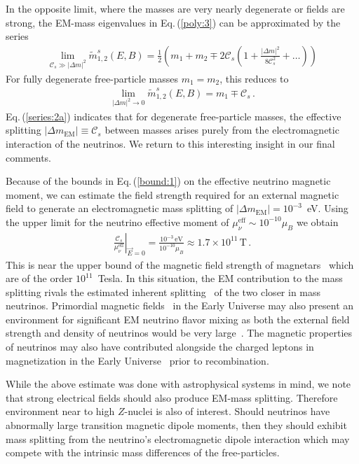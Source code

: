 \documentclass{ws-ijmpa}
\newcommand{\req}[1]{Eq.\,(\ref{#1})}
\begin{document}
In the opposite limit, where the masses are very nearly degenerate or fields are strong, the EM-mass eigenvalues in \req{poly:3} can be approximated by the series
\begin{align}
\label{series:2}
\lim_{\mathcal{C}_{s}\gg|\Delta m|^{2}}\widetilde m_{1,2}^{s}(E,B)=\frac{1}{2}\left(m_{1}+m_{2}\mp2\mathcal{C}_{s}\left(1+\frac{|\Delta m|^{2}}{8\mathcal{C}_{s}^{2}}+\ldots\right)\right)
\end{align}
For fully degenerate free-particle masses $m_{1}=m_{2}$, this reduces to
\begin{align}
\label{series:2a}
\lim_{|\Delta m|^{2}\to0}\widetilde m_{1,2}^{s}(E,B)=m_{1}\mp\mathcal{C}_{s}\,.
\end{align}
\req{series:2a} indicates that for degenerate free-particle masses, the effective splitting $|\Delta m_\mathrm{EM}|\equiv\mathcal{C}_{s}$ between masses arises purely from the electromagnetic interaction of the neutrinos. We return to this interesting insight in our final comments.

Because of the bounds in \req{bound:1} on the effective neutrino magnetic moment, we can estimate the field strength required for an external magnetic field to generate an electromagnetic mass splitting of $|\Delta m_\mathrm{EM}|=10^{-3}$~eV. Using the upper limit for the neutrino effective moment of $\mu_{\nu}^\mathrm{eff}\sim10^{-10}\mu_{B}$ we obtain
\begin{align}
\label{estimate:1}
\left.\frac{\mathcal{C}_{s}}{\mu_{\nu}^\mathrm{eff}}\right\rvert_{\vec{E}=0}=\frac{10^{-3}\,\mathrm{eV}}{10^{-10}\mu_{B}}\approx1.7\times10^{11}\,\mathrm{T}\,.
\end{align}
This is near the upper bound of the magnetic field strength of magnetars~\cite{Kaspi:2017fwg} which are of the order $10^{11}$~Tesla. In this situation, the EM contribution to the mass splitting rivals the estimated inherent splitting~\cite{ParticleDataGroup:2022pth} of the two closer in mass neutrinos. Primordial magnetic fields~\cite{Grasso:2000wj} in the Early Universe may also present an environment for significant EM neutrino flavor mixing as both the external field strength and density of neutrinos would be very large~\cite{Rafelski:2023emw}. The magnetic properties of neutrinos may also have contributed alongside the charged leptons in magnetization in the Early Universe~\cite{Steinmetz:2023nsc} prior to recombination. 

While the above estimate was done with astrophysical systems in mind, we note that strong electrical fields should also produce EM-mass splitting. Therefore environment near to high $Z$-nuclei is also of interest. Should neutrinos have abnormally large transition magnetic dipole moments, then they should exhibit mass splitting from the neutrino's electromagnetic dipole interaction which may compete with the intrinsic mass differences of the free-particles.
\end{document}

